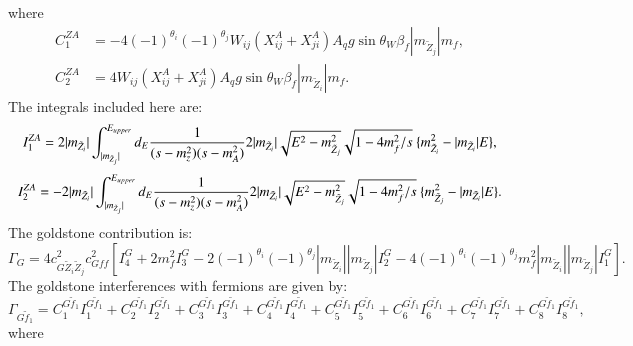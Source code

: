 \documentclass[final,3p,times]{elsarticle}
\begin{document}
where
\begin{align}
C_{1}^{Z A} &= -4(-1)^{\theta_i}(-1)^{\theta_j}W_{ij}(X_{ij}^A + X_{ji}^A)A_{q}g\sin\theta_W \beta_{f} |m_{\tilde{Z}_j}|m_{f}, \\
C_{2}^{Z A} &= 4W_{ij}(X_{ij}^A + X_{ji}^A)A_{q}g\sin\theta_W \beta_{f} |m_{\tilde{Z}_i}|m_{f}.
\end{align}
The integrals included here are:
\begin{equation}
I_{1}^{Z A} = 2|m_{\tilde{Z}_i}|\int_{|m_{\tilde{Z}_j}|}^{E_{upper}} d_{E} {1 \over (s-m_{z}^2)(s-m_{A}^2)}2|m_{\tilde{Z}_i}|\sqrt{E^2-m_{\tilde{Z}_j}^2} \sqrt{1-4m_{f}^2/s} \ \{m_{\tilde{Z}_i}^2 - |m_{\tilde{Z}_i}|E\},
\end{equation}
\begin{equation}
I_{2}^{Z A} = -2|m_{\tilde{Z}_i}|\int_{|m_{\tilde{Z}_j}|}^{E_{upper}} d_{E} {1 \over (s-m_{z}^2)(s-m_{A}^2)}2|m_{\tilde{Z}_i}|\sqrt{E^2-m_{\tilde{Z}_j}^2} \sqrt{1-4m_{f}^2/s} \ \{m_{\tilde{Z}_j}^2 - |m_{\tilde{Z}_i}|E\}.
\end{equation}
The goldstone contribution is:
\begin{equation}
\Gamma_{G} = 4 c_{G \tilde{Z}_i \tilde{Z}_j}^2 c_{G f f}^2\left[I_{4}^G + 2m_{f}^2 I_{3}^G - 2(-1)^{\theta_i}(-1)^{\theta_j}|m_{\tilde{Z}_i}||m_{\tilde{Z}_j}|I_{2}^G - 4(-1)^{\theta_i}(-1)^{\theta_j}m_{f}^2 |m_{\tilde{Z}_i}||m_{\tilde{Z}_j}|I_{1}^G\right].
\end{equation}
The goldstone interferences with fermions are given by:
\begin{equation}
\Gamma_{G \tilde{f}_1} = C_{1}^{G \tilde{f}_1} I_{1}^{G \tilde{f}_1} + C_{2}^{G \tilde{f}_1} I_{2}^{G \tilde{f}_1} + C_{3}^{G \tilde{f}_1} I_{3}^{G \tilde{f}_1} + C_{4}^{G \tilde{f}_1} I_{4}^{G \tilde{f}_1} + C_{5}^{G \tilde{f}_1} I_{5}^{G \tilde{f}_1} + C_{6}^{G \tilde{f}_1} I_{6}^{G \tilde{f}_1} + C_{7}^{G \tilde{f}_1} I_{7}^{G \tilde{f}_1} + C_{8}^{G \tilde{f}_1} I_{8}^{G \tilde{f}_1},
\end{equation}
where
\end{document}
